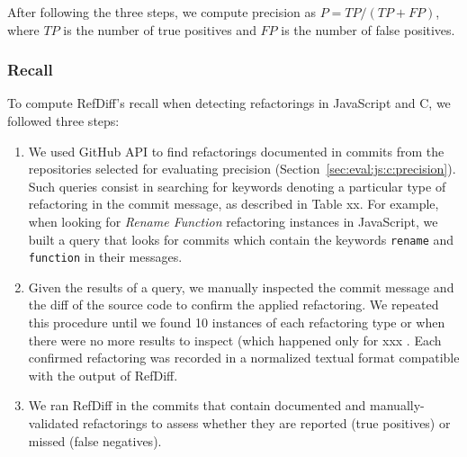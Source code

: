 After following the three steps, we compute precision as $P = \mathit{TP} / (\mathit{TP} + \mathit{FP})$, where $\mathit{TP}$ is the number of true positives and $\mathit{FP}$ is the number of false positives.



\subsubsection{Recall}
\label{sec:eval:js:c:recall}

To compute RefDiff's recall when detecting refactorings in JavaScript and C, we followed three steps:

\begin{enumerate}  
\item We used GitHub API to find refactorings documented in commits from the repositories selected for evaluating precision (Section~\ref{sec:eval:js:c:precision}). Such queries consist in searching for keywords denoting a particular type of refactoring in the commit message, as described in Table xx. For example, when looking for \emph{Rename Function} refactoring instances in JavaScript, we built a query that looks for commits which contain the keywords \texttt{rename} and \texttt{function} in their messages.

\item Given the results of a query, we manually inspected the commit message and the diff of the source code to confirm the applied refactoring. We repeated this procedure until we found 10 instances of each refactoring type or when there were no more results to inspect (which happened only for xxx . Each confirmed refactoring was recorded in a normalized textual format compatible with the output of RefDiff.


\item We ran RefDiff in the commits that contain documented and manually-validated refactorings to assess whether they are reported (true positives) or missed (false negatives). 

\end{enumerate}

